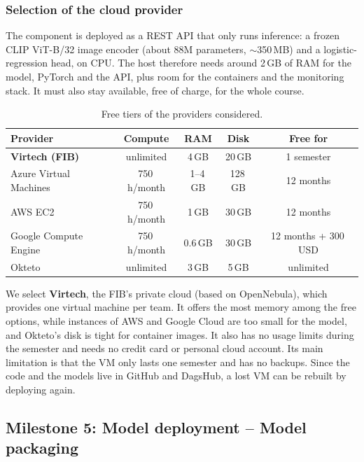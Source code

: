\documentclass[11pt]{article}
\begin{document}
\subsubsection{Selection of the cloud provider}
\label{sec:cloud}
The component is deployed as a REST API that only runs inference: a frozen CLIP ViT-B/32 image encoder (about 88M parameters, $\sim$350\,MB) and a logistic-regression head, on CPU. The host therefore needs around 2\,GB of RAM for the model, PyTorch and the API, plus room for the containers and the monitoring stack. It must also stay available, free of charge, for the whole course.

\begin{table}[H]
\centering
\small
\begin{tabular}{@{}lcccc@{}}
\toprule
\textbf{Provider} & \textbf{Compute} & \textbf{RAM} & \textbf{Disk} & \textbf{Free for} \\
\midrule
\textbf{Virtech (FIB)} & unlimited & 4\,GB & 20\,GB & 1 semester \\
Azure Virtual Machines & 750\,h/month & 1--4\,GB & 128\,GB & 12 months \\
AWS EC2 & 750\,h/month & 1\,GB & 30\,GB & 12 months \\
Google Compute Engine & 750\,h/month & 0.6\,GB & 30\,GB & 12 months + 300\,USD \\
Okteto & unlimited & 3\,GB & 5\,GB & unlimited \\
\bottomrule
\end{tabular}
\caption{Free tiers of the providers considered.}
\label{tab:cloud}
\end{table}

We select \textbf{Virtech}, the FIB's private cloud (based on OpenNebula), which provides one virtual machine per team. It offers the most memory among the free options, while instances of AWS and Google Cloud are too small for the model, and Okteto's disk is tight for container images. It also has no usage limits during the semester and needs no credit card or personal cloud account. Its main limitation is that the VM only lasts one semester and has no backups. Since the code and the models live in GitHub and DagsHub, a lost VM can be rebuilt by deploying again.

\subsection{Milestone 5: Model deployment -- Model packaging}
\end{document}
